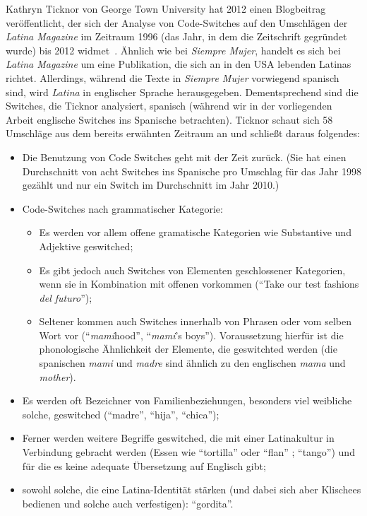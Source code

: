 Kathryn Ticknor von George Town University hat 2012 einen Blogbeitrag veröffentlicht, der sich der Analyse von Code-Switches auf den Umschlägen der \textit{Latina Magazine} im Zeitraum 1996 (das Jahr, in dem die Zeitschrift gegründet wurde) bis 2012 widmet~\cite[]{Ticknor12}.
Ähnlich wie bei \textit{Siempre Mujer}, handelt es sich bei \textit{Latina Magazine} um eine Publikation, die sich an in den USA lebenden Latinas richtet.
Allerdings, während die Texte in \textit{Siempre Mujer} vorwiegend spanisch sind, wird \textit{Latina} in englischer Sprache herausgegeben.
Dementsprechend sind die Switches, die Ticknor analysiert, spanisch (während wir in der vorliegenden Arbeit englische Switches ins Spanische betrachten).
Ticknor schaut sich 58 Umschläge aus dem bereits erwähnten Zeitraum an und schließt daraus folgendes:
\begin{itemize}
  \item Die Benutzung von Code Switches geht mit der Zeit zurück. (Sie hat einen Durchschnitt von acht Switches ins Spanische pro Umschlag für das Jahr 1998 gezählt und nur ein Switch im Durchschnitt im Jahr 2010.)
  \item Code-Switches nach grammatischer Kategorie:
    \begin{itemize}
      \item Es werden vor allem offene gramatische Kategorien wie Substantive und Adjektive geswitched;
      \item Es gibt jedoch auch Switches von Elementen geschlossener Kategorien, wenn sie in Kombination mit offenen vorkommen (``Take our test fashions \textit{del futuro}'');
      \item Seltener kommen auch Switches innerhalb von Phrasen oder vom selben Wort vor (``\textit{mami}hood'', ``\textit{mami}'s boys''). Voraussetzung hierfür ist die phonologische Ähnlichkeit der Elemente, die geswitchted werden (die spanischen \textit{mami} und \textit{madre} sind ähnlich zu den englischen \textit{mama} und \textit{mother}).
    \end{itemize}
  \item Es werden oft Bezeichner von Familienbeziehungen, besonders viel weibliche solche, geswitched (``madre'', ``hija'', ``chica'');
  \item Ferner werden weitere Begriffe geswitched, die mit einer Latinakultur in Verbindung gebracht werden (Essen wie ``tortilla'' oder ``flan'' ; ``tango'') und für die es keine adequate Übersetzung auf Englisch gibt;
  \item sowohl solche, die eine Latina-Identität stärken (und dabei sich aber Klischees bedienen und solche auch verfestigen): ``gordita''.
\end{itemize}

